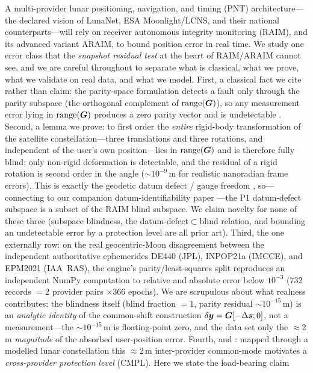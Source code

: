 A multi-provider lunar positioning, navigation, and timing (PNT) architecture---the
declared vision of LunaNet, ESA Moonlight/LCNS, and their national counterparts---will
rely on receiver autonomous integrity monitoring (RAIM), and its advanced variant
ARAIM, to bound position error in real time. We study one error class that the
\emph{snapshot residual test} at the heart of RAIM/ARAIM cannot see, and we are
careful throughout to separate what is classical, what we prove, what we validate on
real data, and what we model. First, a classical fact we cite rather than claim: the
parity-space formulation detects a fault only through the parity subspace (the
orthogonal complement of $\operatorname{range}(\bm{G})$), so any measurement error lying in
$\operatorname{range}(\bm{G})$ produces a zero parity vector and is undetectable
\citep{sturza1988,brown1992,parkinson1988}. Second, a lemma we prove: to first order
the \emph{entire} rigid-body transformation of the satellite constellation---three
translations and three rotations, and independent of the user's own position---lies in
$\operatorname{range}(\bm{G})$ and is therefore fully blind; only non-rigid deformation is detectable,
and the residual of a rigid rotation is second order in the angle
($\sim\!10^{-9}\,$m for realistic nanoradian frame errors). This is exactly the
geodetic datum defect / gauge freedom \citep{baarda1973,teunissen2000}, so---connecting
to our companion datum-identifiability paper \citep{baweja2026datum}---the P1
datum-defect subspace is a subset of the RAIM blind subspace. We claim novelty for
none of these three (subspace blindness, the datum-defect$\subset$blind relation, and
bounding an undetectable error by a protection level are all prior art). Third, the one
externally \Validated{} row: on the real geocentric-Moon disagreement between the
independent authoritative ephemerides DE440 (JPL), INPOP21a (IMCCE), and EPM2021
(IAA~RAS), the engine's parity/least-squares split reproduces an independent NumPy
computation to relative and absolute error below $10^{-3}$
($732$ records $=2$ provider pairs $\times366$ epochs). We are scrupulous about what
realness contributes: the blindness itself (blind fraction $=1$, parity residual
$\sim\!10^{-15}\,$m) is an \emph{analytic identity} of the common-shift construction
$\delta\bm{y}=\bm{G}[-\Delta\bm{s};0]$, not a measurement---the $\sim\!10^{-15}\,$m is
floating-point zero, and the data set only the $\approx\!2\,$m \emph{magnitude} of the
absorbed user-position error. Fourth, and \Modelled{}: mapped through a modelled lunar
constellation this $\approx\!2\,$m inter-provider common-mode motivates a
\emph{cross-provider protection level} (CMPL). Here we state the load-bearing claim
